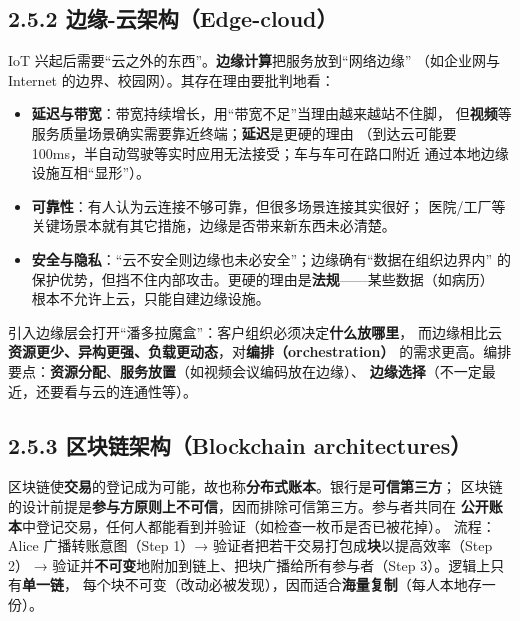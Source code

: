 \subsection*{2.5.2 边缘-云架构（Edge-cloud）}
IoT 兴起后需要“云之外的东西”。\textbf{边缘计算}把服务放到“网络边缘”
（如企业网与 Internet 的边界、校园网）。其存在理由要批判地看：

\begin{itemize}
  \item \textbf{延迟与带宽}：带宽持续增长，用“带宽不足”当理由越来越站不住脚，
        但\textbf{视频}等服务质量场景确实需要靠近终端；\textbf{延迟}是更硬的理由
        （到达云可能要 100ms，半自动驾驶等实时应用无法接受；车与车可在路口附近
        通过本地边缘设施互相“显形”）。
  \item \textbf{可靠性}：有人认为云连接不够可靠，但很多场景连接其实很好；
        医院/工厂等关键场景本就有其它措施，边缘是否带来新东西未必清楚。
  \item \textbf{安全与隐私}：“云不安全则边缘也未必安全”；边缘确有“数据在组织边界内”
        的保护优势，但挡不住内部攻击。更硬的理由是\textbf{法规}——某些数据（如病历）
        根本不允许上云，只能自建边缘设施。
\end{itemize}

\noindent 引入边缘层会打开“潘多拉魔盒”：客户组织必须决定\textbf{什么放哪里}，
而边缘相比云\textbf{资源更少、异构更强、负载更动态}，对\textbf{编排（orchestration）}
的需求更高。编排要点：\textbf{资源分配}、\textbf{服务放置}（如视频会议编码放在边缘）、
\textbf{边缘选择}（不一定最近，还要看与云的连通性等）。

\begin{closeread}
\end{closeread}

\subsection*{2.5.3 区块链架构（Blockchain architectures）}
区块链使\textbf{交易}的登记成为可能，故也称\textbf{分布式账本}。银行是\textbf{可信第三方}；
区块链的设计前提是\textbf{参与方原则上不可信}，因而排除可信第三方。参与者共同在
\textbf{公开账本}中登记交易，任何人都能看到并验证（如检查一枚币是否已被花掉）。
流程：Alice 广播转账意图（Step 1）→ 验证者把若干交易打包成\textbf{块}以提高效率（Step 2）
→ 验证并\textbf{不可变}地附加到链上、把块广播给所有参与者（Step 3）。逻辑上只有\textbf{单一链}，
每个块不可变（改动必被发现），因而适合\textbf{海量复制}（每人本地存一份）。

